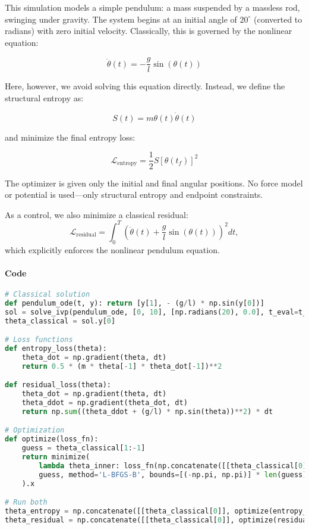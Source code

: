 \documentclass[12pt]{article}
\begin{document}
This simulation models a simple pendulum: a mass suspended by a massless rod, swinging under gravity. The system begins at an initial angle of \( 20^\circ \) (converted to radians) with zero initial velocity. Classically, this is governed by the nonlinear equation:

\[
\ddot{\theta}(t) = -\frac{g}{l} \sin(\theta(t))
\]

Here, however, we avoid solving this equation directly. Instead, we define the structural entropy as:

\[
S(t) = m \theta(t) \dot{\theta}(t)
\]

and minimize the final entropy loss:

\[
\mathcal{L}_{\text{entropy}} = \frac{1}{2} S[\theta(t_f)]^2
\]

The optimizer is given only the initial and final angular positions. No force model or potential is used—only structural entropy and endpoint constraints.

As a control, we also minimize a classical residual:
\[
\mathcal{L}_{\text{residual}} = \int_0^T \left(\ddot{\theta}(t) + \frac{g}{l} \sin(\theta(t))\right)^2 dt,
\]
which explicitly enforces the nonlinear pendulum equation.

\paragraph*{Code}\mbox{}
\begin{lstlisting}[language=Python]
# Classical solution
def pendulum_ode(t, y): return [y[1], - (g/l) * np.sin(y[0])]
sol = solve_ivp(pendulum_ode, [0, 10], [np.radians(20), 0.0], t_eval=t_eval)
theta_classical = sol.y[0]

# Loss functions
def entropy_loss(theta): 
    theta_dot = np.gradient(theta, dt)
    return 0.5 * (m * theta[-1] * theta_dot[-1])**2

def residual_loss(theta): 
    theta_dot = np.gradient(theta, dt)
    theta_ddot = np.gradient(theta_dot, dt)
    return np.sum((theta_ddot + (g/l) * np.sin(theta))**2) * dt

# Optimization
def optimize(loss_fn): 
    guess = theta_classical[1:-1]
    return minimize(
        lambda theta_inner: loss_fn(np.concatenate([[theta_classical[0]], theta_inner, [theta_classical[-1]]])),
        guess, method='L-BFGS-B', bounds=[(-np.pi, np.pi)] * len(guess)
    ).x

# Run both
theta_entropy = np.concatenate([[theta_classical[0]], optimize(entropy_loss), [theta_classical[-1]]])
theta_residual = np.concatenate([[theta_classical[0]], optimize(residual_loss), [theta_classical[-1]]])
\end{lstlisting}
\end{document}
